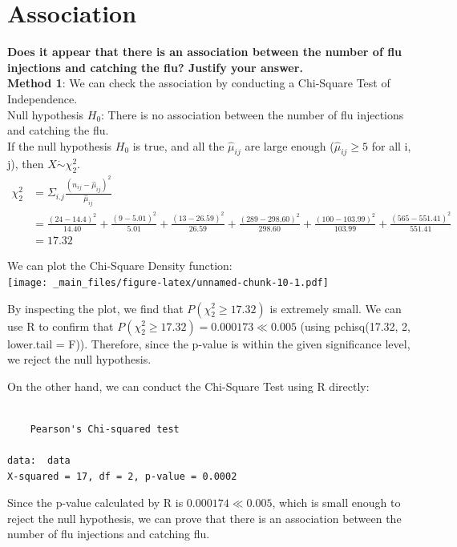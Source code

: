 \documentclass[
]{book}
\begin{document}
\section{Association}\label{association}

\textbf{Does it appear that there is an association between the number of flu injections and catching the flu? Justify your answer.}\\

\textbf{Method 1}: We can check the association by conducting a Chi-Square Test of Independence.\\
Null hypothesis \(H_0\): There is no association between the number of flu injections and catching the flu.\\
If the null hypothesis \(H_0\) is true, and all the \(\hat{\mu}_{ij}\) are large enough (\(\hat{\mu}_{ij} \geq 5\) for all i, j), then \(X \mathrel{\dot\sim} \chi_{2}^{2}\).
\[\begin{aligned}
  \chi_{2}^{2} &= \Sigma_{i.j} \frac{(n_{ij} - \hat{\mu}_{ij})^2}{\hat{\mu}_{ij}} \\
  &= \frac{(24 - 14.4)^2}{14.40} + \frac{(9 - 5.01)^2}{5.01} + \frac{(13-26.59)^2}{26.59} + \frac{(289 - 298.60)^2}{298.60} + \frac{(100 - 103.99)^2}{103.99} + \frac{(565 - 551.41)^2}{551.41} \\
  &= 17.32
\end{aligned}\]

We can plot the Chi-Square Density function:\\

\texttt{[image: \_main\_files/figure-latex/unnamed-chunk-10-1.pdf]}

By inspecting the plot, we find that \(P(\chi_{2}^{2} \geq 17.32)\) is extremely small. We can use R to confirm that \(P(\chi_{2}^{2} \geq 17.32) = 0.000173 \ll 0.005\) (using pchisq(17.32, 2, lower.tail = F)). Therefore, since the p-value is within the given significance level, we reject the null hypothesis.

On the other hand, we can conduct the Chi-Square Test using R directly:

\begin{verbatim}

    Pearson's Chi-squared test

data:  data
X-squared = 17, df = 2, p-value = 0.0002
\end{verbatim}

Since the p-value calculated by R is \(0.000174 \ll 0.005\), which is small enough to reject the null hypothesis, we can prove that there is an association between the number of flu injections and catching flu.\\
\end{document}
